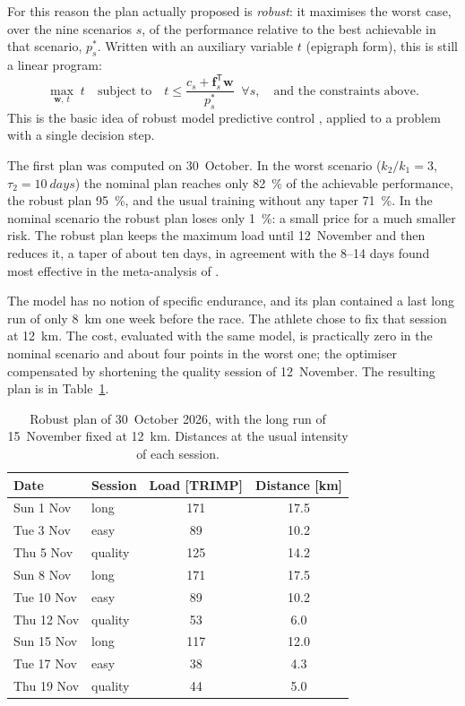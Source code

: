 \documentclass[11pt,a4paper]{article}
\begin{document}
For this reason the plan actually proposed is \emph{robust}: it maximises the
worst case, over the nine scenarios $s$, of the performance relative to the best
achievable in that scenario, $p_s^*$. Written with an auxiliary variable $t$
(epigraph form), this is still a linear program:
\begin{equation}
\max_{\mathbf{w},\, t} \; t
\quad \text{subject to} \quad
t \leq \frac{c_s + \mathbf{f}_s^{\mathsf T}\mathbf{w}}{p_s^*} \;\; \forall s,
\quad \text{and the constraints above}.
\label{eq:robust}
\end{equation}
This is the basic idea of robust model predictive control
\citep{bemporad1999}, applied to a problem with a single decision step.

The first plan was computed on 30~October. In the worst scenario
($k_2/k_1 = 3$, $\tau_2 = \SI{10}{days}$) the nominal plan reaches only
\SI{82}{\percent} of the achievable performance, the robust plan
\SI{95}{\percent}, and the usual training without any taper \SI{71}{\percent}.
In the nominal scenario the robust plan loses only \SI{1}{\percent}: a small price
for a much smaller risk. The robust plan keeps the maximum load until
12~November and then reduces it, a taper of about ten days, in agreement with
the 8--14 days found most effective in the meta-analysis of \citet{bosquet2007}.

The model has no notion of specific endurance, and its plan contained a last
long run of only \SI{8}{km} one week before the race. The athlete chose to fix
that session at \SI{12}{km}. The cost, evaluated with the same model, is
practically zero in the nominal scenario and about four points in the worst
one; the optimiser compensated by shortening the quality session of
12~November. The resulting plan is in Table~\ref{tab:plan}.

\begin{table}[ht]
\centering
\caption{Robust plan of 30~October 2026, with the long run of 15~November fixed
at \SI{12}{km}. Distances at the usual intensity of each session.}
\label{tab:plan}
\small
\begin{tabular}{@{}llcc@{}}
\toprule
Date & Session & Load [TRIMP] & Distance [km] \\
\midrule
Sun 1 Nov  & long    & 171 & 17.5 \\
Tue 3 Nov  & easy    &  89 & 10.2 \\
Thu 5 Nov  & quality & 125 & 14.2 \\
Sun 8 Nov  & long    & 171 & 17.5 \\
Tue 10 Nov & easy    &  89 & 10.2 \\
Thu 12 Nov & quality &  53 &  6.0 \\
Sun 15 Nov & long    & 117 & 12.0 \\
Tue 17 Nov & easy    &  38 &  4.3 \\
Thu 19 Nov & quality &  44 &  5.0 \\
\bottomrule
\end{tabular}
\end{table}
\end{document}
